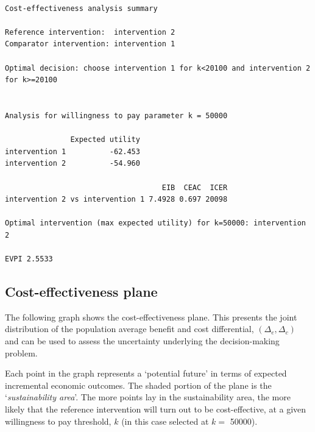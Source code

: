 \documentclass[]{article}
\newenvironment{Shaded}{\begin{snugshade}}{\end{snugshade}}
\newcommand{\ControlFlowTok}[1]{\textcolor[rgb]{0.13,0.29,0.53}{\textbf{#1}}}
\newcommand{\DataTypeTok}[1]{\textcolor[rgb]{0.13,0.29,0.53}{#1}}
\newcommand{\DecValTok}[1]{\textcolor[rgb]{0.00,0.00,0.81}{#1}}
\newcommand{\KeywordTok}[1]{\textcolor[rgb]{0.13,0.29,0.53}{\textbf{#1}}}
\newcommand{\NormalTok}[1]{#1}
\newcommand{\OperatorTok}[1]{\textcolor[rgb]{0.81,0.36,0.00}{\textbf{#1}}}
\newcommand{\OtherTok}[1]{\textcolor[rgb]{0.56,0.35,0.01}{#1}}
\newcommand{\StringTok}[1]{\textcolor[rgb]{0.31,0.60,0.02}{#1}}
\begin{document}
\begin{verbatim}

Cost-effectiveness analysis summary 

Reference intervention:  intervention 2
Comparator intervention: intervention 1

Optimal decision: choose intervention 1 for k<20100 and intervention 2 for k>=20100


Analysis for willingness to pay parameter k = 50000

               Expected utility
intervention 1          -62.453
intervention 2          -54.960

                                    EIB  CEAC  ICER
intervention 2 vs intervention 1 7.4928 0.697 20098

Optimal intervention (max expected utility) for k=50000: intervention 2
           
EVPI 2.5533
\end{verbatim}

\hypertarget{cost-effectiveness-plane}{%
\subsection{Cost-effectiveness plane}\label{cost-effectiveness-plane}}

The following graph shows the cost-effectiveness plane. This presents
the joint distribution of the population average benefit and cost
differential, \((\Delta_e,\Delta_c)\) and can be used to assess the
uncertainty underlying the decision-making problem.

Each point in the graph represents a `potential future' in terms of
expected incremental economic outcomes. The shaded portion of the plane
is the `\emph{sustainability area}'. The more points lay in the
sustainability area, the more likely that the reference intervention
will turn out to be cost-effective, at a given willingness to pay
threshold, \(k\) (in this case selected at \(k=\) 50000).

\begin{Shaded}
\end{Shaded}
\end{document}
